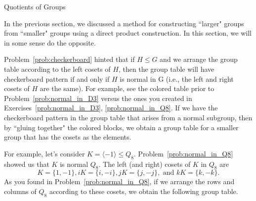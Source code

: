 \begin{section}{Quotients of Groups}

In the previous section, we discussed a method for constructing ``larger" groups from ``smaller" groups using a direct product construction.  In this section, we will in some sense do the opposite.

Problem~\ref{prob:checkerboard} hinted that if $H\leq G$ and we arrange the group table according to the left cosets of $H$, then the group table will have checkerboard pattern if and only if $H$ is normal in G (i.e., the left and right cosets of $H$ are the same).  For example, see the colored table prior to Problem~\ref{prob:normal_in_D3} versus the ones you created in Exercises~\ref{prob:normal_in_D3}, \ref{prob:normal_in_Q8}.  If we have the checkerboard pattern in the group table that arises from a normal subgroup, then by ``gluing together" the colored blocks, we obtain a group table for a smaller group that has the cosets as the elements. 

For example, let's consider $K=\langle -1\rangle \leq Q_8$.  Problem~\ref{prob:normal_in_Q8} showed us that $K$ is normal $Q_8$.  The left (and right) cosets of $K$ in $Q_8$ are
\[
K=\{1,-1\}, iK=\{i,-i\}, jK=\{j,-j\}, \text{ and } kK=\{k,-k\}.
\]
As you found in Problem~\ref{prob:normal_in_Q8}, if we arrange the rows and columns of $Q_8$ according to these cosets, we obtain the following group table.


\end{section}
